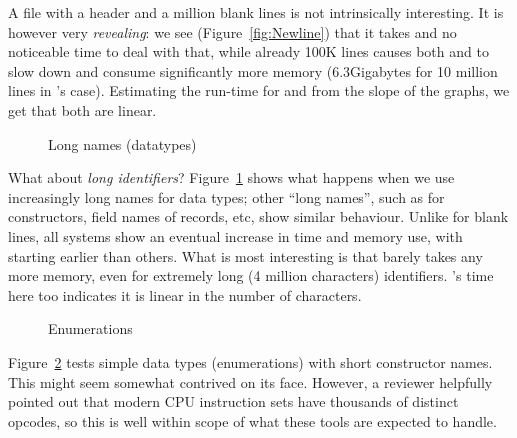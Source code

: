 \documentclass[a4paper,UKenglish,cleveref, autoref, thm-restate,anonymous]{lipics-v2021}
\begin{document}
A file with a header and a million blank lines is not intrinsically
interesting.  It is however very \emph{revealing}: we see
(Figure~\ref{fig:Newline}) that it takes \lean and \rocq no noticeable time to
deal with that, while already 100K lines causes both \agda and \idris to slow
down and consume significantly more memory (6.3Gigabytes for 10 million lines
in \idris's case).  Estimating the run-time for \agda and \idris from the slope
of the graphs, we get that both are linear.

\begin{figure}[h]
\begin{minipage}{0.50\textwidth}
\scalebox{0.75}{}
\end{minipage}
\begin{minipage}{0.50\textwidth}
\scalebox{0.75}{}
\end{minipage}
\caption{Long names (datatypes)}
\label{fig:LongNameDataType}
\end{figure}

What about \emph{long identifiers}? Figure~\ref{fig:LongNameDataType} shows what happens when we
use increasingly long names for data types; other ``long names'', such as for constructors,
field names of records, etc, show similar behaviour. Unlike for blank lines, all systems show
an eventual increase in time and memory use, with \agda starting earlier than others. What is most 
interesting is that \lean barely takes any more memory, even for extremely long (4 million characters)
identifiers. \agda's time here too indicates it is linear in the number of characters.

\begin{figure}[h]
\begin{minipage}{0.50\textwidth}
\scalebox{0.75}{}
\end{minipage}
\begin{minipage}{0.50\textwidth}
\scalebox{0.75}{}
\end{minipage}
\caption{Enumerations}
\label{fig:Enum}
\end{figure}

Figure~\ref{fig:Enum} tests simple data types (enumerations) with short constructor names.
This might seem somewhat contrived on its face. However, a reviewer helpfully pointed out that
modern CPU instruction sets have thousands of distinct opcodes, so this is well within scope
of what these tools are expected to handle.
\end{document}
